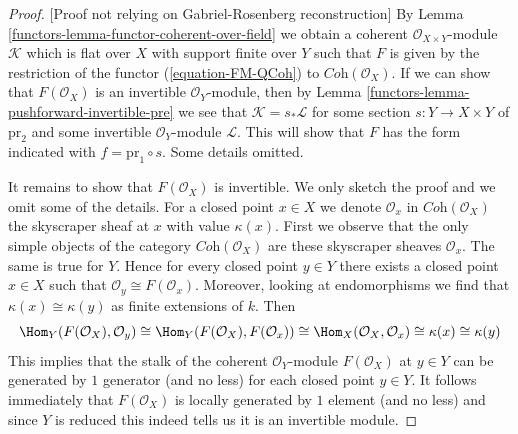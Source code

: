 \begin{proof}
[Proof not relying on Gabriel-Rosenberg reconstruction]
By Lemma \ref{functors-lemma-functor-coherent-over-field} we obtain a coherent
$\mathcal{O}_{X \times Y}$-module $\mathcal{K}$ which is flat
over $X$ with support finite over $Y$ such that $F$ is given by
the restriction of the functor
(\ref{equation-FM-QCoh}) to $\textit{Coh}(\mathcal{O}_X)$.
If we can show that $F(\mathcal{O}_X)$ is an invertible $\mathcal{O}_Y$-module,
then by Lemma \ref{functors-lemma-pushforward-invertible-pre}
we see that $\mathcal{K} = s_*\mathcal{L}$
for some section $s : Y \to X \times Y$ of $\text{pr}_2$ and some
invertible $\mathcal{O}_Y$-module $\mathcal{L}$.
This will show that $F$ has the form indicated with
$f = \text{pr}_1 \circ s$. Some details omitted.

\medskip\noindent
It remains to show that $F(\mathcal{O}_X)$ is invertible. We only
sketch the proof and we omit some of the details.
For a closed point $x \in X$ we denote
$\mathcal{O}_x$ in $\textit{Coh}(\mathcal{O}_X)$
the skyscraper sheaf at $x$ with value $\kappa(x)$.
First we observe that the only simple objects
of the category $\textit{Coh}(\mathcal{O}_X)$
are these skyscraper sheaves $\mathcal{O}_x$.
The same is true for $Y$. Hence for every closed point $y \in Y$
there exists a closed point $x \in X$ such that
$\mathcal{O}_y \cong F(\mathcal{O}_x)$. Moreover, looking at endomorphisms
we find that $\kappa(x) \cong \kappa(y)$ as finite extensions of $k$.
Then
$$
\Hom_Y(F(\mathcal{O}_X), \mathcal{O}_y) \cong
\Hom_Y(F(\mathcal{O}_X), F(\mathcal{O}_x)) \cong
\Hom_X(\mathcal{O}_X, \mathcal{O}_x) \cong \kappa(x) \cong \kappa(y)
$$
This implies that the stalk of the coherent $\mathcal{O}_Y$-module
$F(\mathcal{O}_X)$ at $y \in Y$ can be generated by $1$ generator
(and no less) for each closed point $y \in Y$. It follows immediately
that $F(\mathcal{O}_X)$ is locally generated by $1$ element (and no less)
and since $Y$ is reduced this indeed tells us it is an invertible module.
\end{proof}



